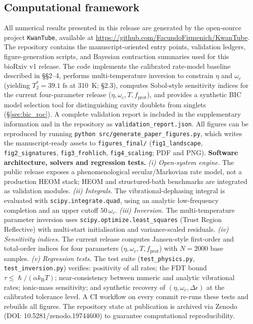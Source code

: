 \documentclass[twocolumn,10pt]{article}
\renewcommand{\hbar}{\hslash}
\newcommand{\kB}{k_{\text{B}}}
\newcommand{\fs}{\text{~fs}}
\begin{document}
\subsection{Computational framework}
\label{sec:code}
All numerical results presented in this release are generated by the
open-source project \texttt{KwanTube}, available at
\url{https://github.com/FacundoFirmenich/KwanTube}. The repository contains
the manuscript-oriented entry points, validation ledgers, figure-generation
scripts, and Bayesian contraction summaries used for this bioRxiv v1 release. The code
implements the calibrated rate-model baseline described in \S\S 2--4,
performs multi-temperature inversion to constrain $\eta$ and $\omega_c$
(yielding $T_2^* = 39.1\fs$ at 310~K; \S 2.3), computes Sobol-style
sensitivity indices for the current four-parameter release
($\eta,\omega_c,T,f_{\text{prot}}$), and provides a synthetic BIC model
selection tool for distinguishing cavity doublets from singlets
(\S\ref{sec:bic_roc}). A complete validation report is included
in the supplementary information and in the repository as
\texttt{validation\_report.json}. All figures can be reproduced by
running \texttt{python src/generate\_paper\_figures.py}, which writes the
manuscript-ready assets to \texttt{figures\_final/}
(\texttt{fig1\_landscape}, \texttt{fig2\_signatures},
\texttt{fig3\_frohlich}, \texttt{fig4\_scaling}; PDF and PNG).
\textbf{Software architecture, solvers and regression tests.}
\emph{(i) Open-system engine.} The public release exposes a
phenomenological secular/Markovian rate model, not a production HEOM stack;
HEOM and structured-bath benchmarks are integrated as validation modules.
\emph{(ii) Integrals.} The vibrational-dephasing integral is evaluated with
\texttt{scipy.integrate.quad}, using an analytic low-frequency completion and
an upper cutoff $50\,\omega_c$.
\emph{(iii) Inversion.} The multi-temperature parameter inversion uses
\texttt{scipy.optimize.least\_squares} (Trust Region Reflective) with
multi-start initialisation and variance-scaled residuals.
\emph{(iv) Sensitivity indices.} The current release computes Jansen-style
first-order and total-order indices for four parameters
($\eta,\omega_c,T,f_{\text{prot}}$) with $N=2000$ base samples.
\emph{(v) Regression tests.} The test suite
(\texttt{test\_physics.py}, \texttt{test\_inversion.py}) verifies: positivity
of all rates; the FDT bound $\tau\le\hbar/(\alpha\kB T)$; near-consistency
between numeric and analytic vibrational rates; ionic-mass sensitivity; and
synthetic recovery of $(\eta,\omega_c,\Delta\epsilon)$ at the calibrated
tolerance level. A CI workflow on
every commit re-runs these tests and rebuilds all figures. The repository
state at publication is archived via Zenodo (DOI: 10.5281/zenodo.19744600)
to guarantee computational reproducibility.
\end{document}
